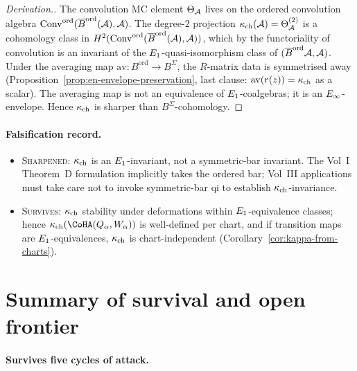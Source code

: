 \begin{proof}[Derivation.]
The convolution MC element $\Theta_{\mathcal{A}}$ lives on the ordered
convolution algebra $\mathrm{Conv}^{\mathrm{ord}}(\overline{B}^{\mathrm{ord}}(\mathcal{A}), \mathcal{A})$.
The degree-$2$ projection $\kappa_{\mathrm{ch}}(\mathcal{A}) = \Theta_{\mathcal{A}}^{(2)}$ is a
cohomology class in
$H^2(\mathrm{Conv}^{\mathrm{ord}}(\overline{B}^{\mathrm{ord}}(\mathcal{A}), \mathcal{A}))$,
which by the functoriality of convolution is an invariant of the
$E_1$-quasi-isomorphism class of $(\overline{B}^{\mathrm{ord}}\mathcal{A}, \mathcal{A})$.
Under the averaging map
$\mathrm{av} \colon B^{\mathrm{ord}} \to B^\Sigma$, the $R$-matrix
data is symmetrised away
(Proposition~\ref{prop:en-envelope-preservation}, last clause:
$\mathrm{av}(r(z)) = \kappa_{\mathrm{ch}}$ as a scalar). The averaging map is
not an equivalence of $E_1$-coalgebras; it is an
$E_\infty$-envelope. Hence $\kappa_{\mathrm{ch}}$ is sharper than
$B^\Sigma$-cohomology.
\end{proof}

\paragraph{Falsification record.}
\begin{itemize}
\item
\textsc{Sharpened}: $\kappa_{\mathrm{ch}}$ is an $E_1$-invariant, not a
symmetric-bar invariant. The Vol~I Theorem~D formulation
implicitly takes the ordered bar; Vol~III applications must
take care not to invoke symmetric-bar qi to establish
$\kappa_{\mathrm{ch}}$-invariance.

\item
\textsc{Survives}: $\kappa_{\mathrm{ch}}$ stability under deformations within
$E_1$-equivalence classes; hence
$\kch(\CoHA(Q_\alpha, W_\alpha))$ is well-defined per chart, and
if transition maps are $E_1$-equivalences,
$\kappa_{\mathrm{ch}}$ is chart-independent
(Corollary~\ref{cor:kappa-from-charts}).
\end{itemize}

\section*{Summary of survival and open frontier}

\paragraph{Survives five cycles of attack.}

